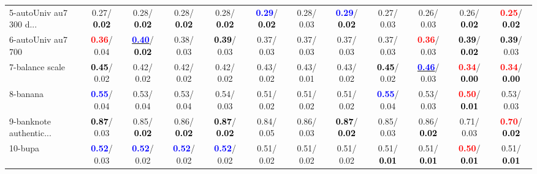 \begin{table}[h]
\begin{center}
{\begin{tabular}{lc|c|c|c|c|c|c|c|c|c|c}
5-autoUniv au7 300 d... &   0.27/\textcolor{black}{\textbf{  0.02}} &   0.28/\textcolor{black}{\textbf{  0.02}} &   0.28/\textcolor{black}{\textbf{  0.02}} &   0.28/\textcolor{black}{\textbf{  0.02}} & \textcolor{blue}{\textbf{  0.29}}/\textcolor{black}{\textbf{  0.02}} &   0.28/  0.03 & \textcolor{blue}{\textbf{  0.29}}/\textcolor{black}{\textbf{  0.02}} &   0.27/  0.03 &   0.26/  0.03 &   0.26/\textcolor{black}{\textbf{  0.02}} & \textcolor{red}{\textbf{  0.25}}/\textcolor{black}{\textbf{  0.02}} \\
6-autoUniv au7 700 & \textcolor{red}{\textbf{  0.36}}/  0.04 & \underline{\textcolor{blue}{\textbf{  0.40}}}/\textcolor{black}{\textbf{  0.02}} &   0.38/  0.03 & \textcolor{black}{\textbf{  0.39}}/  0.03 &   0.37/  0.03 &   0.37/  0.03 &   0.37/  0.03 &   0.37/  0.03 & \textcolor{red}{\textbf{  0.36}}/  0.03 & \textcolor{black}{\textbf{  0.39}}/\textcolor{black}{\textbf{  0.02}} & \textcolor{black}{\textbf{  0.39}}/  0.03 \\
7-balance scale & \textcolor{black}{\textbf{  0.45}}/  0.02 &   0.42/  0.02 &   0.42/  0.02 &   0.42/  0.02 &   0.43/  0.02 &   0.43/  0.01 &   0.43/  0.02 & \textcolor{black}{\textbf{  0.45}}/  0.02 & \underline{\textcolor{blue}{\textbf{  0.46}}}/  0.03 & \textcolor{red}{\textbf{  0.34}}/\textcolor{black}{\textbf{  0.00}} & \textcolor{red}{\textbf{  0.34}}/\textcolor{black}{\textbf{  0.00}} \\ \hline
8-banana & \textcolor{blue}{\textbf{  0.55}}/  0.04 &   0.53/  0.04 &   0.53/  0.04 &   0.54/  0.03 &   0.51/  0.02 &   0.51/  0.02 &   0.51/  0.02 & \textcolor{blue}{\textbf{  0.55}}/  0.04 &   0.53/  0.03 & \textcolor{red}{\textbf{  0.50}}/\textcolor{black}{\textbf{  0.01}} &   0.53/  0.03 \\
9-banknote authentic... & \textcolor{black}{\textbf{  0.87}}/  0.03 &   0.85/\textcolor{black}{\textbf{  0.02}} &   0.86/\textcolor{black}{\textbf{  0.02}} & \textcolor{black}{\textbf{  0.87}}/\textcolor{black}{\textbf{  0.02}} &   0.84/  0.05 &   0.86/  0.03 & \textcolor{black}{\textbf{  0.87}}/\textcolor{black}{\textbf{  0.02}} &   0.85/  0.03 &   0.86/\textcolor{black}{\textbf{  0.02}} &   0.71/  0.03 & \textcolor{red}{\textbf{  0.70}}/\textcolor{black}{\textbf{  0.02}} \\
10-bupa & \textcolor{blue}{\textbf{  0.52}}/  0.03 & \textcolor{blue}{\textbf{  0.52}}/  0.02 & \textcolor{blue}{\textbf{  0.52}}/  0.02 & \textcolor{blue}{\textbf{  0.52}}/  0.02 &   0.51/  0.02 &   0.51/  0.02 &   0.51/  0.02 &   0.51/\textcolor{black}{\textbf{  0.01}} &   0.51/\textcolor{black}{\textbf{  0.01}} & \textcolor{red}{\textbf{  0.50}}/\textcolor{black}{\textbf{  0.01}} &   0.51/\textcolor{black}{\textbf{  0.01}} \\

\end{tabular}}
\end{center}
\end{table}
